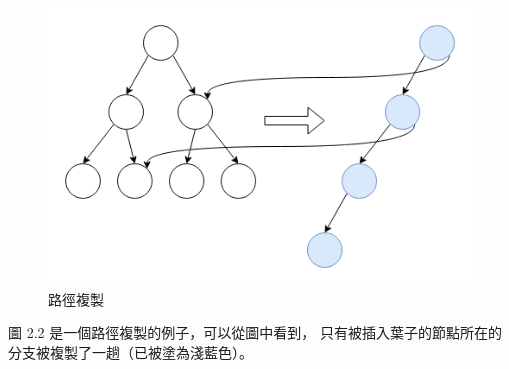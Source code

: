 \begin{figure}
\includegraphics[width=\textwidth]{../images/路徑複製.png}
\caption{路徑複製}
\end{figure}

圖 2.2 是一個路徑複製的例子，可以從圖中看到，
只有被插入葉子的節點所在的分支被複製了一趟（已被塗為淺藍色）。
